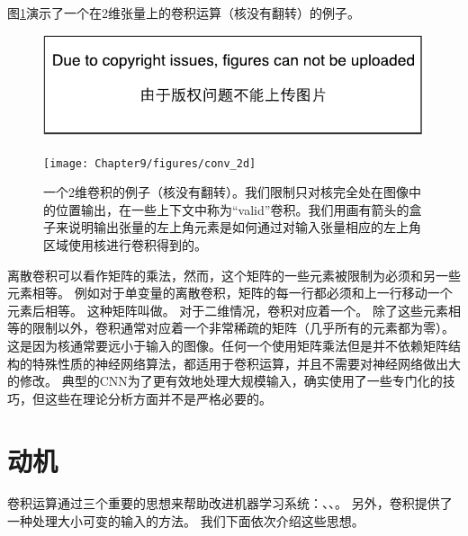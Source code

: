 图\ref{fig:chap9_conv_2d}演示了一个在2维张量上的卷积运算（核没有翻转）的例子。
\begin{figure}[!htb]
\ifOpenSource
\centerline{\includegraphics{figure.pdf}}
\else
\centerline{\texttt{[image: Chapter9/figures/conv\_2d]}}
\fi
\caption{一个2维卷积的例子（核没有翻转）。我们限制只对核完全处在图像中的位置输出，在一些上下文中称为``\gls{valid}''卷积。我们用画有箭头的盒子来说明输出张量的左上角元素是如何通过对输入张量相应的左上角区域使用核进行卷积得到的。}
\label{fig:chap9_conv_2d}
\end{figure}

离散卷积可以看作矩阵的乘法，然而，这个矩阵的一些元素被限制为必须和另一些元素相等。
例如对于单变量的离散卷积，矩阵的每一行都必须和上一行移动一个元素后相等。
这种矩阵叫做。
对于二维情况，卷积对应着一个。
除了这些元素相等的限制以外，卷积通常对应着一个非常稀疏的矩阵（几乎所有的元素都为零）。
这是因为核通常要远小于输入的图像。任何一个使用矩阵乘法但是并不依赖矩阵结构的特殊性质的神经网络算法，都适用于卷积运算，并且不需要对神经网络做出大的修改。
典型的\gls{CNN}为了更有效地处理大规模输入，确实使用了一些专门化的技巧，但这些在理论分析方面并不是严格必要的。

 
\section{动机}
\label{sec:motivation}

卷积运算通过三个重要的思想来帮助改进机器学习系统：、、。
另外，卷积提供了一种处理大小可变的输入的方法。
我们下面依次介绍这些思想。

